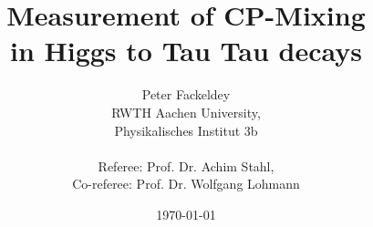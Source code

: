 

\usepackage{braket}



\title{Measurement of CP-Mixing \\ in Higgs to Tau Tau decays}
\author{Peter Fackeldey\\
  RWTH Aachen University,\\
  Physikalisches Institut 3b\\ \\
  Referee: Prof. Dr. Achim Stahl, \\
  Co-referee: Prof. Dr. Wolfgang Lohmann\\
}
\date{\today}
\maketitle


\tableofcontents



\cleardoublepage
{}
 





